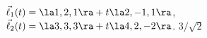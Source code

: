 {$\vec\ell_1(t) = \la 1,2,1\ra + t\la 2,-1,1\ra$,\\
$\vec\ell_2(t) = \la 3,3,3\ra + t\la 4,2,-2\ra$.
}
{$3/\sqrt{2}$
}

